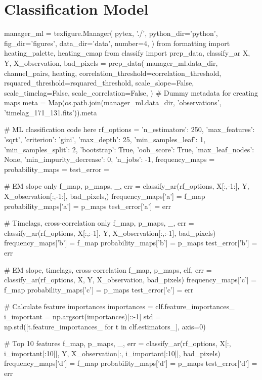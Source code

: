 \section{Classification Model}\label{sec:compare}

\begin{pycode}[manager_ml]
manager_ml = texfigure.Manager(
    pytex, './',
    python_dir='python',
    fig_dir='figures',
    data_dir='data',
    number=4,
)
from formatting import heating_palette, heating_cmap
from classify import prep_data, classify_ar
X, Y, X_observation, bad_pixels = prep_data(
    manager_ml.data_dir,
    channel_pairs,
    heating,
    correlation_threshold=correlation_threshold,
    rsquared_threshold=rsquared_threshold,
    scale_slope=False,
    scale_timelag=False,
    scale_correlation=False,
)
# Dummy metadata for creating maps
meta = Map(os.path.join(manager_ml.data_dir, 'observations', 'timelag_171_131.fits')).meta

# ML classification code here
rf_options = {
    'n_estimators': 250,
    'max_features': 'sqrt',
    'criterion': 'gini',
    'max_depth': 25,
    'min_samples_leaf': 1,
    'min_samples_split': 2,
    'bootstrap': True,
    'oob_score': True,
    'max_leaf_nodes': None,
    'min_impurity_decrease': 0,
    'n_jobs': -1,
}
frequency_maps = {}
probability_maps = {}
test_error = {}

# EM slope only
f_map, p_maps, _, err = classify_ar(rf_options, X[:,-1:], Y, X_observation[:,-1:], bad_pixels,)
frequency_maps['a'] = f_map
probability_maps['a'] = p_maps
test_error['a'] = err

# Timelags, cross-correlation only
f_map, p_maps, _, err = classify_ar(rf_options, X[:,:-1], Y, X_observation[:,:-1], bad_pixels)
frequency_maps['b'] = f_map
probability_maps['b'] = p_maps
test_error['b'] = err

# EM slope, timelags, cross-correlation
f_map, p_maps, clf, err = classify_ar(rf_options, X, Y, X_observation, bad_pixels)
frequency_maps['c'] = f_map
probability_maps['c'] = p_maps
test_error['c'] = err

# Calculate feature importances
importances = clf.feature_importances_
i_important = np.argsort(importances)[::-1]
std = np.std([t.feature_importances_ for t in clf.estimators_], axis=0)

# Top 10 features
f_map, p_maps, _, err = classify_ar(rf_options, X[:, i_important[:10]], Y,
                                    X_observation[:, i_important[:10]], bad_pixels)
frequency_maps['d'] = f_map
probability_maps['d'] = p_maps
test_error['d'] = err
\end{pycode}

